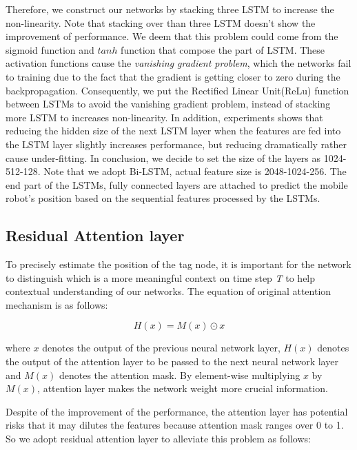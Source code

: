 \documentclass[letterpaper, 10 pt, conference]{ieeeconf}  %
\begin{document}
Therefore, we construct our networks by stacking three LSTM to increase the non-linearity. Note that stacking over than three LSTM doesn't show the improvement of performance. We deem that this problem could come from the sigmoid function and $tanh$ function that compose the part of LSTM. These activation functions cause the \textit{vanishing gradient problem}\cite{pascanu2013difficulty}, which the networks fail to training due to the fact that the gradient is getting closer to zero during the backpropagation. Consequently, we put the Rectified Linear Unit(ReLu) function between LSTMs to avoid the vanishing gradient problem\cite{nair2010rectified}, instead of stacking more LSTM to increases non-linearity. In addition, experiments shows that reducing the hidden size of the next LSTM layer when the features are fed into the LSTM layer slightly increases performance, but reducing dramatically rather cause under-fitting. In conclusion, we decide to set the size of the layers as 1024-512-128. Note that we adopt Bi-LSTM, actual feature size is 2048-1024-256. The end part of the LSTMs, fully connected layers are attached to predict the mobile robot's position based on the sequential features processed by the LSTMs.  

\subsection{Residual Attention layer}

To precisely estimate the position of the tag node, it is important for the network to distinguish which is a more meaningful context on time step \textit{T} to help contextual understanding of our networks. The equation of original attention mechanism is as follows:  

\begin{equation}
H(x)=M(x)\odot x
\end{equation} 

where $x$ denotes the output of the previous neural network layer, $H(x)$ denotes the output of the attention layer to be passed to the next neural network layer and $M(x)$ denotes the attention mask. By element-wise multiplying $x$ by $M(x)$, attention layer makes the network weight more crucial information. 

Despite of the improvement of the performance, the attention layer has potential risks that it may dilutes the features because attention mask ranges over 0 to 1. So we adopt residual attention layer to alleviate this problem as follows\cite{wang2017residual}:
\end{document}
